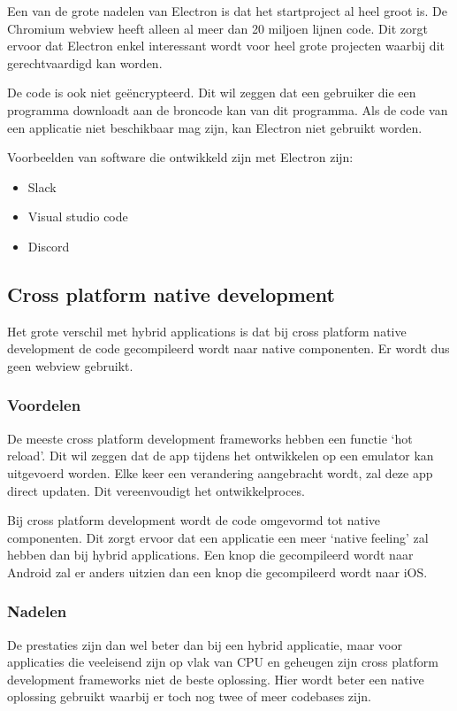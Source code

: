 		Een van de grote nadelen van Electron is dat het startproject al heel groot is. De Chromium webview heeft alleen al meer dan 20 miljoen lijnen code. Dit zorgt ervoor dat Electron enkel interessant wordt voor heel grote projecten waarbij dit gerechtvaardigd kan worden.
		
		De code is ook niet geëncrypteerd. Dit wil zeggen dat een gebruiker die een programma downloadt aan de broncode kan van dit programma. Als de code van een applicatie niet beschikbaar mag zijn, kan Electron niet gebruikt worden.
		
		Voorbeelden van software die ontwikkeld zijn met Electron zijn:
		\begin{itemize}
			\item	Slack
			\item	Visual studio code
			\item	Discord
		\end{itemize}

\newpage
\subsection{Cross platform native development}
Het grote verschil met hybrid applications is dat bij cross platform native development de code gecompileerd wordt naar native componenten. Er wordt dus geen webview gebruikt.
\autocite{Ghinea2018}
\autocite{DeConinck2019}

	\subsubsection{Voordelen}
		De meeste cross platform development frameworks hebben een functie ‘hot reload’. Dit wil zeggen dat de app tijdens het ontwikkelen op een emulator kan uitgevoerd worden. Elke keer een verandering aangebracht wordt, zal deze app direct updaten. Dit vereenvoudigt het ontwikkelproces. 
		
		Bij cross platform development wordt de code omgevormd tot native componenten. Dit zorgt ervoor dat een applicatie een meer ‘native feeling’ zal hebben dan bij hybrid applications. Een knop die gecompileerd wordt naar Android zal er anders uitzien dan een knop die gecompileerd wordt naar iOS.
		\autocite{Asp2017}
	
	\subsubsection{Nadelen}
		De prestaties zijn dan wel beter dan bij een hybrid applicatie, maar voor applicaties die veeleisend zijn op vlak van CPU en geheugen zijn cross platform development frameworks niet de beste oplossing. Hier wordt beter een native oplossing gebruikt waarbij er toch nog twee of meer codebases zijn.
		\autocite{Asp2017}
		
